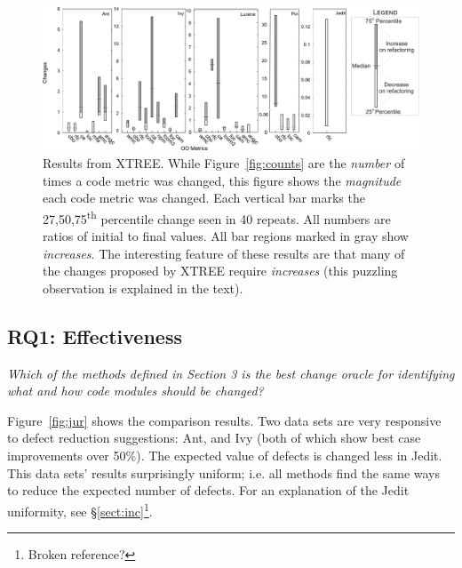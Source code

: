 \documentclass[twocolumn,5p]{elsarticle}
\newcommand{\tion}[1]{\S\ref{sect:#1}}
\newcommand{\fig}[1]{Figure~\ref{fig:#1}}
\newcommand{\eq}[1]{Equation~\ref{eq:#1}}
\theoremstyle{break}
\begin{document}
\begin{itemize}
		
		\begin{figure}[!t]
			\centering
			\includegraphics[width=\linewidth]{figs/changes01.png}
			\caption{Results  from XTREE.
				While \fig{counts} are the {\em number} of times a code metric was changed,
				this  figure shows the {\em magnitude} each code metric was changed. Each vertical bar
				marks the 27,50,75\textsuperscript{th} percentile change seen in 40 repeats.
				All numbers are ratios of initial to final values.
				All bar regions marked in gray show {\em increases}.
				The interesting feature of these results are that many
				of the changes proposed by XTREE require {\em increases}
				(this puzzling observation is explained in the text).}
			\label{fig:changes}
		\end{figure}
		
		
		
		\subsection{RQ1: Effectiveness}
		
		{\em Which of the methods defined in Section 3 is the best change oracle for identifying what and how code modules should be changed? }
		
		\fig{jur} shows the comparison results.  
		Two data sets are very responsive to defect reduction suggestions:
		Ant, and Ivy (both of which show best case improvements over 50\%).
		The  expected value of defects  
		is changed less in Jedit. This data sets' results
		surprisingly uniform; i.e.   all methods
		find the same ways to reduce the expected number of
		defects.   For an explanation of the Jedit uniformity, see \tion{inc}\footnote{Broken reference?}.
		

\end{itemize}
\end{document}
